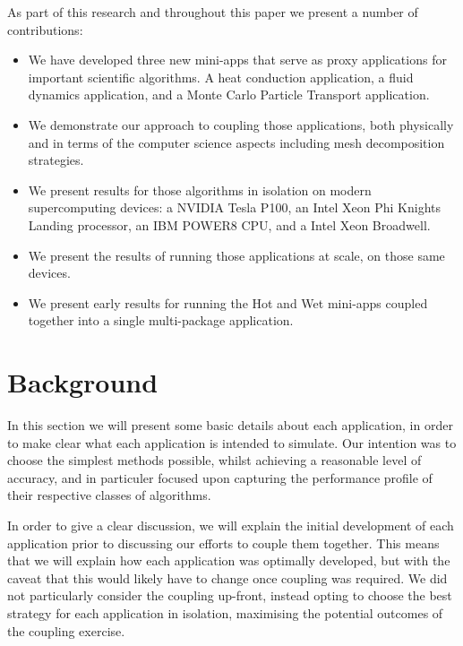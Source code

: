 \documentclass[runningheads,a4paper]{llncs}
\begin{document}
As part of this research and throughout this paper we present a number of contributions:

\begin{itemize}
    \item We have developed three new mini-apps that serve as proxy applications for important scientific algorithms. A heat conduction application, a fluid dynamics application, and a Monte Carlo Particle Transport application.

\item We demonstrate our approach to coupling those applications, both physically and in terms of the computer science aspects including mesh decomposition strategies.

\item We present results for those algorithms in isolation on modern supercomputing devices: a NVIDIA Tesla P100, an Intel Xeon Phi Knights Landing processor, an IBM POWER8 CPU, and a Intel Xeon Broadwell.

  \item We present the results of running those applications at scale, on those same devices.

    \item We present early results for running the Hot and Wet mini-apps coupled together into a single multi-package application.
\end{itemize}

\section{Background}

In this section we will present some basic details about each application, in order to make clear what each application is intended to simulate. Our intention was to choose the simplest methods possible, whilst achieving a reasonable level of accuracy, and in particuler focused upon capturing the performance profile of their respective classes of algorithms.

In order to give a clear discussion, we will explain the initial development of each application prior to discussing our efforts to couple them together. This means that we will explain how each application was optimally developed, but with the caveat that this would likely have to change once coupling was required. We did not particularly consider the coupling up-front, instead opting to choose the best strategy for each application in isolation, maximising the potential outcomes of the coupling exercise.
\end{document}

